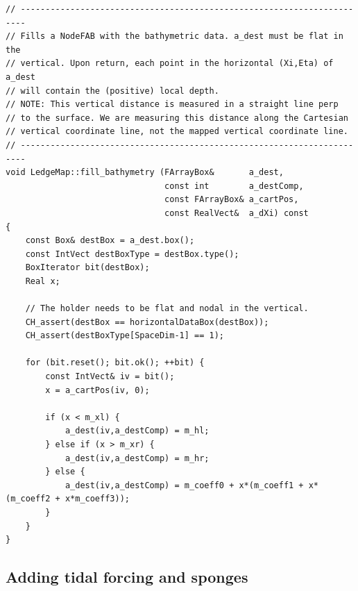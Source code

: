 \documentclass[12pt]{article}
\begin{document}
\begin{lstlisting}[caption={The updated \texttt{fill\_bathymetry} function. Notice that this code checks if \texttt{a\_dest} is properly defined. These checks will only exist in debug mode. If desired, the for-loop can be implemented and optimized in Fortran, but I will leave that to the reader.}]
// -----------------------------------------------------------------------
// Fills a NodeFAB with the bathymetric data. a_dest must be flat in the
// vertical. Upon return, each point in the horizontal (Xi,Eta) of a_dest
// will contain the (positive) local depth.
// NOTE: This vertical distance is measured in a straight line perp
// to the surface. We are measuring this distance along the Cartesian
// vertical coordinate line, not the mapped vertical coordinate line.
// -----------------------------------------------------------------------
void LedgeMap::fill_bathymetry (FArrayBox&       a_dest,
                                const int        a_destComp,
                                const FArrayBox& a_cartPos,
                                const RealVect&  a_dXi) const
{
    const Box& destBox = a_dest.box();
    const IntVect destBoxType = destBox.type();
    BoxIterator bit(destBox);
    Real x;

    // The holder needs to be flat and nodal in the vertical.
    CH_assert(destBox == horizontalDataBox(destBox));
    CH_assert(destBoxType[SpaceDim-1] == 1);

	for (bit.reset(); bit.ok(); ++bit) {
		const IntVect& iv = bit();
		x = a_cartPos(iv, 0);

		if (x < m_xl) {
			a_dest(iv,a_destComp) = m_hl;
		} else if (x > m_xr) {
			a_dest(iv,a_destComp) = m_hr;
		} else {
			a_dest(iv,a_destComp) = m_coeff0 + x*(m_coeff1 + x*(m_coeff2 + x*m_coeff3));
		}
	}
}
\end{lstlisting}

\subsection{Adding tidal forcing and sponges}
\end{document}
